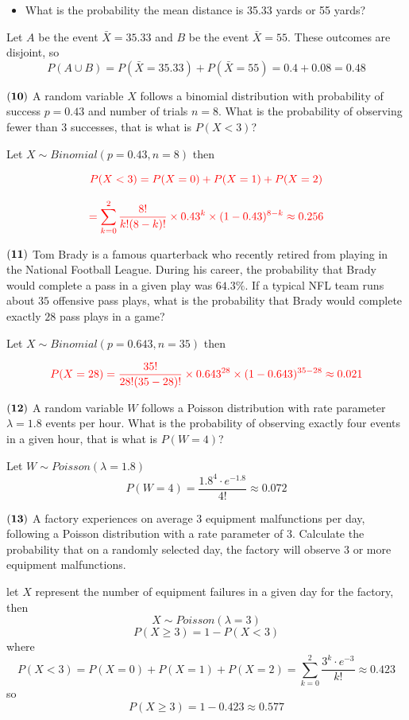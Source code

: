 \documentclass[
]{article}
\providecommand{\tightlist}{%
  \setlength{\itemsep}{0pt}\setlength{\parskip}{0pt}}
\begin{document}
\begin{itemize}
\tightlist
\item
  What is the probability the mean distance is 35.33 yards or 55 yards?
\end{itemize}

{Let \(A\) be the event \(\bar{X} = 35.33\) and \(B\) be the event
\(\bar{X} = 55\). These outcomes are disjoint, so
\[P(A\cup B) = P(\bar{X} = 35.33)+P(\bar{X} = 55) = 0.4+0.08 = 0.48 \]}

\(\bf (10)\) A random variable \(X\) follows a binomial distribution
with probability of success \(p = 0.43\) and number of trials \(n = 8\).
What is the probability of observing fewer than 3 successes, that is
what is \(P(X < 3)\)?

{Let \(X \sim Binomial(p = 0.43, n = 8)\) then}

\[ \color{red}{P(X < 3) =  P(X = 0)+P(X = 1)+P(X = 2)}\]

\[ \color{red}{= \sum_{k = 0}^2 \frac{8!}{k!(8 - k)!} \times 0.43^{k} \times (1-0.43)^{8-k} \approx 0.256}\]

\(\bf (11)\) Tom Brady is a famous quarterback who recently retired from
playing in the National Football League. During his career, the
probability that Brady would complete a pass in a given play was
\(64.3\%\). If a typical NFL team runs about \(35\) offensive pass
plays, what is the probability that Brady would complete exactly \(28\)
pass plays in a game?

Let \(X \sim Binomial(p = 0.643, n = 35)\) then

\[\color{red}{P(X = 28) = \frac{35!}{28!(35 - 28)!} \times 0.643^{28}\times (1-0.643)^{35-28} \approx 0.021}\]

\(\bf (12)\) A random variable \(W\) follows a Poisson distribution with
rate parameter \(\lambda = 1.8\) events per hour. What is the
probability of observing exactly four events in a given hour, that is
what is \(P(W = 4)\)?

{Let \(W\sim Poisson(\lambda = 1.8)\)
\[P(W = 4) = \frac{1.8^4\cdot e^{-1.8}}{4!} \approx 0.072 \]}

\(\bf (13)\) A factory experiences on average 3 equipment malfunctions
per day, following a Poisson distribution with a rate parameter of 3.
Calculate the probability that on a randomly selected day, the factory
will observe 3 or more equipment malfunctions.

{let \(X\) represent the number of equipment failures in a given day for
the factory, then \[X\sim Poisson(\lambda = 3)\]
\[P(X\geq 3) = 1 - P(X< 3)\] where
\[P(X < 3) =  P(X = 0)+P(X = 1)+P(X = 2) = \sum_{k=0}^2 \frac{3^k\cdot e^{-3}}{k!} \approx 0.423\]
so \[P(X\geq 3) = 1 - 0.423 \approx 0.577\] }
\end{document}
